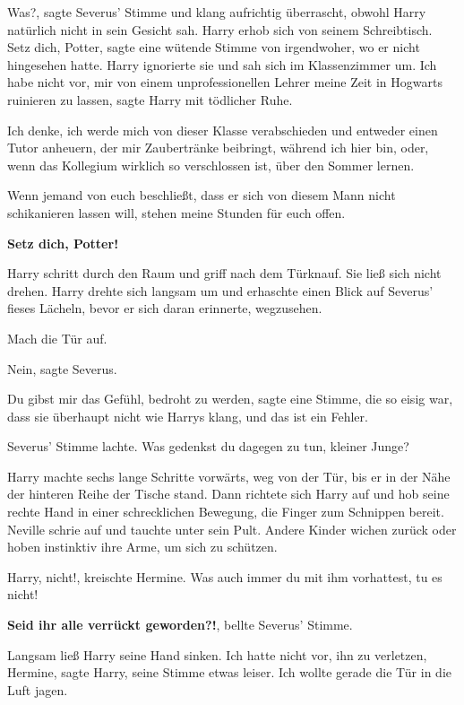 \glqq{}Was?\grqq{}, sagte Severus' Stimme und klang aufrichtig überrascht, obwohl
Harry natürlich nicht in sein Gesicht sah. Harry erhob sich von seinem
Schreibtisch. \glqq{}Setz dich, Potter\grqq{}, sagte eine wütende Stimme von
irgendwoher, wo er nicht hingesehen hatte. Harry ignorierte sie und sah sich im
Klassenzimmer um. \glqq{}Ich habe nicht vor, mir von einem unprofessionellen
Lehrer meine Zeit in Hogwarts ruinieren zu lassen\grqq{}, sagte Harry mit
tödlicher Ruhe.

\glqq{}Ich denke, ich werde mich von dieser Klasse verabschieden und entweder
einen Tutor anheuern, der mir Zaubertränke beibringt, während ich hier bin,
oder, wenn das Kollegium wirklich so verschlossen ist, über den Sommer lernen.

Wenn jemand von euch beschließt, dass er sich von diesem Mann nicht schikanieren
lassen will, stehen meine Stunden für euch offen.\grqq{}

\textbf{\glqq{}Setz dich, Potter!\grqq{}}

Harry schritt durch den Raum und griff nach dem Türknauf. Sie ließ sich nicht
drehen. Harry drehte sich langsam um und erhaschte einen Blick auf Severus'
fieses Lächeln, bevor er sich daran erinnerte, wegzusehen.

\glqq{}Mach die Tür auf.\grqq{}

\glqq{}Nein\grqq{}, sagte Severus.

\glqq{}Du gibst mir das Gefühl, bedroht zu werden\grqq{}, sagte eine Stimme, die
so eisig war, dass sie überhaupt nicht wie Harrys klang, \glqq{}und das ist ein
Fehler.\grqq{}

Severus' Stimme lachte. \glqq{}Was gedenkst du dagegen zu tun, kleiner
Junge?\grqq{}

Harry machte sechs lange Schritte vorwärts, weg von der Tür, bis er in der Nähe
der hinteren Reihe der Tische stand. Dann richtete sich Harry auf und hob seine
rechte Hand in einer schrecklichen Bewegung, die Finger zum Schnippen bereit.
Neville schrie auf und tauchte unter sein Pult. Andere Kinder wichen zurück oder
hoben instinktiv ihre Arme, um sich zu schützen.

\glqq{}Harry, nicht!\grqq{}, kreischte Hermine. \glqq{}Was auch immer du mit ihm
vorhattest, tu es nicht!\grqq{}

\glqq{}\textbf{Seid ihr alle verrückt geworden?!}\grqq{}, bellte Severus' Stimme.

Langsam ließ Harry seine Hand sinken. \glqq{}Ich hatte nicht vor, ihn zu
verletzen, Hermine\grqq{}, sagte Harry, seine Stimme etwas leiser. \glqq{}Ich
wollte gerade die Tür in die Luft jagen.\grqq{}


